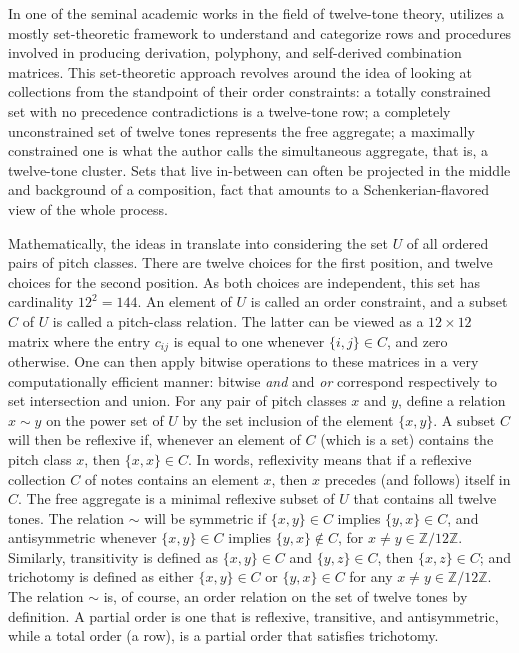 In one of the seminal academic works in the field of twelve-tone theory, \cite{Starr1984} utilizes a mostly set-theoretic framework to understand and categorize rows and procedures involved in producing derivation, polyphony, and self-derived combination matrices. This set-theoretic approach revolves around the idea of looking at collections from the standpoint of their order constraints: a totally constrained set with no precedence contradictions is a twelve-tone row; a completely unconstrained set of twelve tones represents the free aggregate; a maximally constrained one is what the author calls the simultaneous aggregate, that is, a twelve-tone cluster. Sets that live in-between can often be projected in the middle and background of a composition, fact that amounts to a Schenkerian-flavored view of the whole process.

Mathematically, the ideas in \cite{Starr1984} translate into considering the set $U$ of all ordered pairs of pitch classes. There are twelve choices for the first position, and twelve choices for the second position. As both choices are independent, this set has cardinality $12^2 = 144$. An element of $U$ is called an order constraint, and a subset $C$ of $U$ is called a pitch-class relation. The latter can be viewed as a $12 \times 12$ matrix where the entry $c_{ij}$ is equal to one whenever $\{ i, j \} \in C$, and zero otherwise. One can then apply bitwise operations to these matrices in a very computationally efficient manner: bitwise \emph{and} and \emph{or} correspond respectively to set intersection and union. For any pair of pitch classes $x$ and $y$, define a relation $x \sim y$ on the power set of $U$ by the set inclusion of the element $\{ x, y \}$. A subset $C$ will then be reflexive if, whenever an element of $C$ (which is a set) contains the pitch class $x$, then $\{ x, x \} \in C$. In words, reflexivity means that if a reflexive collection $C$ of notes contains an element $x$, then $x$ precedes (and follows) itself in $C$. The free aggregate is a minimal reflexive subset of $U$ that contains all twelve tones. The relation $\sim$ will be symmetric if $\{ x, y \} \in C$ implies $\{ y, x \} \in C$, and antisymmetric whenever $\{ x, y \} \in C$ implies $\{ y, x \} \notin C$, for $x \ne y \in \mathbb{Z}/ 12 \mathbb{Z}$. Similarly, transitivity is defined as $\{ x, y \} \in C$ and $\{ y, z \} \in C$, then $\{ x, z\} \in C$; and trichotomy is defined as either $\{ x, y \} \in C$ or $\{ y, x \} \in C$ for any $x \ne y \in \mathbb{Z}/ 12 \mathbb{Z}$. The relation $\sim$ is, of course, an order relation on the set of twelve tones by definition. A partial order is one that is reflexive, transitive, and antisymmetric, while a total order (a row), is a partial order that satisfies trichotomy.


